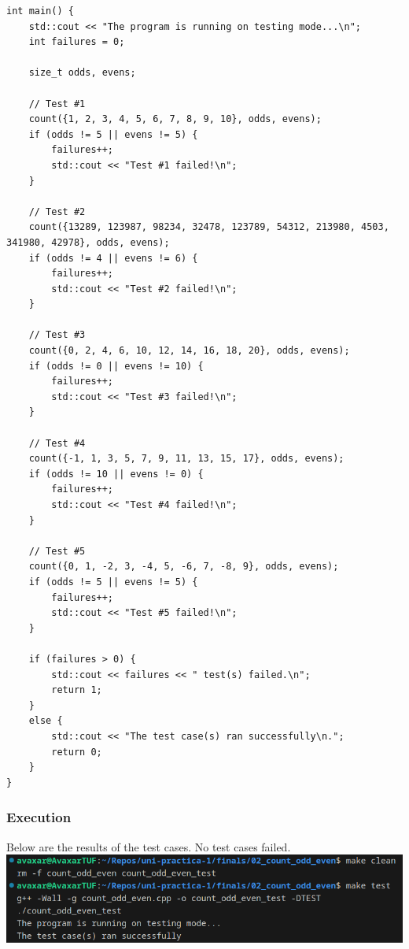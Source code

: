 \documentclass[12pt]{article}
\begin{document}
\begin{verbatim}
int main() {
    std::cout << "The program is running on testing mode...\n";
    int failures = 0;

    size_t odds, evens;

    // Test #1
    count({1, 2, 3, 4, 5, 6, 7, 8, 9, 10}, odds, evens);
    if (odds != 5 || evens != 5) {
        failures++;
        std::cout << "Test #1 failed!\n";
    }

    // Test #2
    count({13289, 123987, 98234, 32478, 123789, 54312, 213980, 4503, 341980, 42978}, odds, evens);
    if (odds != 4 || evens != 6) {
        failures++;
        std::cout << "Test #2 failed!\n";
    }

    // Test #3
    count({0, 2, 4, 6, 10, 12, 14, 16, 18, 20}, odds, evens);
    if (odds != 0 || evens != 10) {
        failures++;
        std::cout << "Test #3 failed!\n";
    }

    // Test #4
    count({-1, 1, 3, 5, 7, 9, 11, 13, 15, 17}, odds, evens);
    if (odds != 10 || evens != 0) {
        failures++;
        std::cout << "Test #4 failed!\n";
    }

    // Test #5
    count({0, 1, -2, 3, -4, 5, -6, 7, -8, 9}, odds, evens);
    if (odds != 5 || evens != 5) {
        failures++;
        std::cout << "Test #5 failed!\n";
    }

    if (failures > 0) {
        std::cout << failures << " test(s) failed.\n";
        return 1;
    }
    else {
        std::cout << "The test case(s) ran successfully\n.";
        return 0;
    }
}
\end{verbatim}

\subsubsection{Execution}
Below are the results of the test cases. No test cases failed.
\newline\includegraphics[width=\textwidth]{02_count_odd_even_test}
\end{document}

